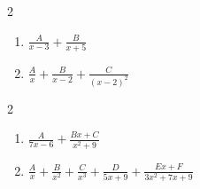 \documentclass{ximera}
\begin{document}
	\author{Stitz-Zeager}




\begin{multicols}{2}
\begin{enumerate}

\item $\frac{A}{x - 3} + \frac{B}{x + 5}$
\item $\frac{A}{x} + \frac{B}{x - 2} + \frac{C}{(x - 2)^{2}}$

\setcounter{HW}{\value{enumi}}
\end{enumerate}
\end{multicols}

\begin{multicols}{2}
\begin{enumerate}
\setcounter{enumi}{\value{HW}}

\item $\frac{A}{7x - 6} + \frac{Bx + C}{x^{2} + 9}$
\item $\frac{A}{x} + \frac{B}{x^{2}} + \frac{C}{x^{3}} + \frac{D}{5x + 9} + \frac{Ex + F}{3x^{2} + 7x + 9}$

\setcounter{HW}{\value{enumi}}
\end{enumerate}
\end{multicols}
\end{document}
